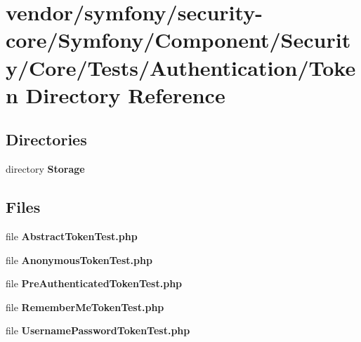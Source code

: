 \section{vendor/symfony/security-\/core/\+Symfony/\+Component/\+Security/\+Core/\+Tests/\+Authentication/\+Token Directory Reference}
\label{dir_5ea7614badc9e8e84e1cc727ab1801ed}
\subsection*{Directories}
\begin{DoxyCompactItemize}
\item 
directory {\bf Storage}
\end{DoxyCompactItemize}
\subsection*{Files}
\begin{DoxyCompactItemize}
\item 
file {\bf Abstract\+Token\+Test.\+php}
\item 
file {\bf Anonymous\+Token\+Test.\+php}
\item 
file {\bf Pre\+Authenticated\+Token\+Test.\+php}
\item 
file {\bf Remember\+Me\+Token\+Test.\+php}
\item 
file {\bf Username\+Password\+Token\+Test.\+php}
\end{DoxyCompactItemize}
